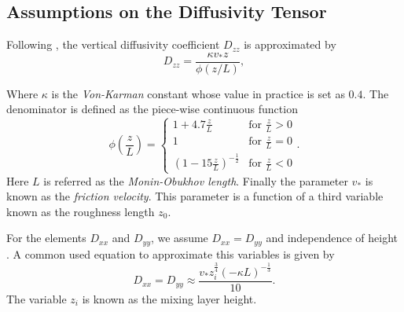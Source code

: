 \documentclass[12pt]{book}
\begin{document}
\subsection{Assumptions on the Diffusivity Tensor}
Following \cite{monin1954basic},  the vertical diffusivity coefficient $D_{zz}$ is approximated by
\begin{equation}\label{eqnEddyVertical}
D_{zz}=\frac{\kappa v_{*} z}{\phi(z/L)},
\end{equation}

Where $\kappa$ is the \textit{Von-Karman} constant whose value in practice is set as $0.4$. The denominator
is defined as the piece-wise continuous function
\begin{equation*}
\phi\left(\frac{z}{L}\right)=\left\{
			\begin{array}{ll}				
				1+4.7\frac{z}{L} &\mbox{for }\frac{z}{L}>0 \\
				1 &\mbox{for }\frac{z}{L}=0\\
				(1-15\frac{z}{L})^{-\frac{1}{2}}&\mbox{for }\frac{z}{L}<0
			\end{array}.
		\right.
\end{equation*}
Here $L$ is referred as the \textit{Monin-Obukhov length}. Finally the parameter $v_{*}$ is known as 
the \textit{friction velocity}. This parameter is a  function of a third variable known as 
the roughness length $z_{0}$. 

For the elements $D_{xx}$ and $D_{yy}$, we assume $D_{xx}=D_{yy}$ and independence of height 
\cite{monin1954basic}. A common used equation
to approximate this variables is given by
\begin{equation*}
D_{xx}=D_{yy}\approx \frac{v_{*}z_{i}^{\frac{3}{4}}(-\kappa L)^{-\frac{1}{3}}}{10}.
\end{equation*}
The variable $z_{i}$ is known as the mixing layer height.
\end{document}
